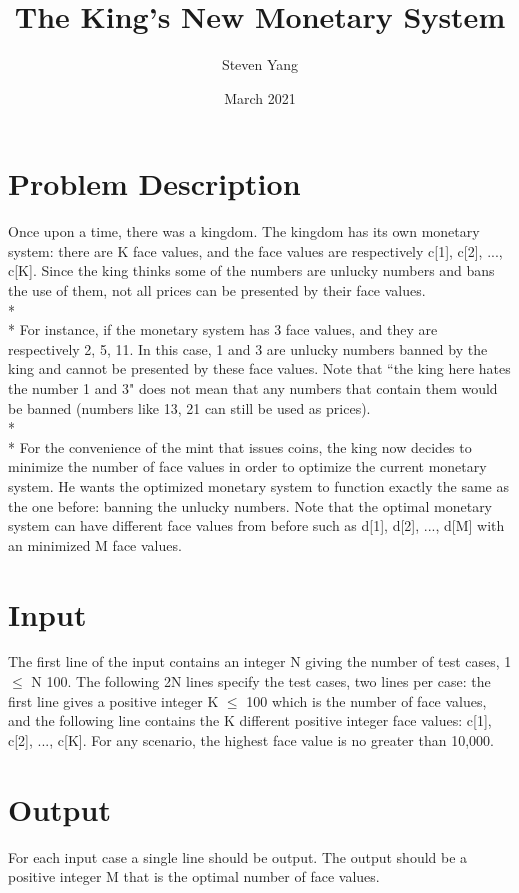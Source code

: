 \documentclass{article}
\title{The King's New Monetary System}
\author{Steven Yang}
\date{March 2021}
\begin{document}
\maketitle

\section{Problem Description}
Once upon a time, there was a kingdom. The kingdom has its own monetary system: there are K face values, and the face values are respectively c[1], c[2], ..., c[K]. Since the king thinks some of the numbers are unlucky numbers and bans the use of them, not all prices can be presented by their face values. 
\\*\\*
For instance, if the monetary system has 3 face values, and they are respectively 2, 5, 11. In this case, 1 and 3 are unlucky numbers banned by the king and cannot be presented by these face values. Note that ``the king here hates the number 1 and 3" does not mean that any numbers that contain them would be banned (numbers like 13, 21 can still be used as prices). 
\\*\\*
For the convenience of the mint that issues coins, the king now decides to minimize the number of face values in order to optimize the current monetary system. He wants the optimized monetary system to function exactly the same as the one before: banning the unlucky numbers. Note that the optimal monetary system can have different face values from before such as d[1], d[2], ..., d[M] with an minimized M face values.

\section{Input}
The first line of the input contains an integer N giving the number of test cases, 1 $\leq$ N  100. The following 2N lines specify the test cases, two lines per case: the first line gives a positive integer K $\leq$ 100 which is the number of face values, and the following line contains the K different positive integer face values: c[1], c[2], ..., c[K]. For any scenario, the highest face value is no greater than 10,000.

\section{Output}
For each input case a single line should be output. The output should be a positive integer M that is the optimal number of face values.
\end{document}
